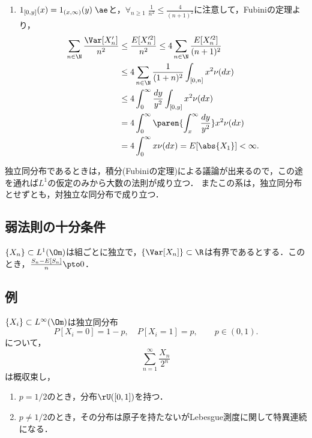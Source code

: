\documentclass[uplatex,dvipdfmx]{jsreport}
\begin{document}
\begin{Proof}
\begin{enumerate}
        \item $1_{[0,y]}(x)=1_{(x,\infty)}(y)\;\ae$と，$\forall_{n\ge1}\;\frac{1}{n^2}\le\frac{4}{(n+1)^2}$に注意して，Fubiniの定理より，
        \begin{align*}
            \sum_{n\in\N}\frac{\Var[X_n']}{n^2}&\le\frac{E[X_n'^2]}{n^2}\le4\sum_{n\in\N}\frac{E[X_n'^2]}{(n+1)^2}\\
            &\le4\sum_{n\in\N}\frac{1}{(1+n)^2}\int_{[0,n]}x^2\nu(dx)\\
            &\le4\int^\infty_0\frac{dy}{y^2}\int_{[0,y]}x^2\nu(dx)\\
            &=4\int^\infty_0\paren{\int^\infty_x\frac{dy}{y^2}}x^2\nu(dx)\\
            &=4\int^\infty_0x\nu(dx)=E[\abs{X_1}]<\infty.
        \end{align*}
    \end{enumerate}
\end{Proof}
\begin{remarks}
    独立同分布であるときは，積分(Fubiniの定理)による議論が出来るので，この途を通れば$L^1$の仮定のみから大数の法則が成り立つ．
    またこの系は，独立同分布とせずとも，対独立な同分布で成り立つ．
\end{remarks}

\subsection{弱法則の十分条件}

\begin{theorem}
    $\{X_n\}\subset L^1(\Om)$は組ごとに独立で，$\{\Var[X_n]\}\subset\R$は有界であるとする．このとき，$\frac{S_n-E[S_n]}{n}\pto0$．
\end{theorem}

\subsection{例}

\begin{example}
    $\{X_i\}\subset L^\infty(\Om)$は独立同分布
    \[P[X_i=0]=1-p,\quad P[X_i=1]=p,\qquad p\in(0,1).\]
    について，
    \[\sum_{n=1}^\infty\frac{X_n}{2^n}\]
    は概収束し，
    \begin{enumerate}
        \item $p=1/2$のとき，分布$\rU([0,1])$を持つ．
        \item $p\ne1/2$のとき，その分布は原子を持たないがLebesgue測度に関して特異連続になる．
    \end{enumerate}
\end{example}
\end{document}

